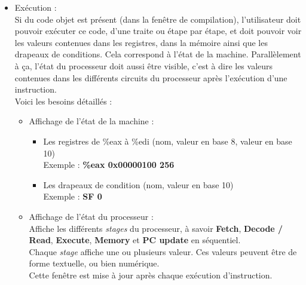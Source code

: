\documentclass[french]{article}
\begin{document}
\begin{itemize}
    \item Exécution :\\
    Si du code objet est présent (dans la fenêtre de compilation), l'utilisateur doit pouvoir exécuter ce code, d'une traite ou étape par étape, et doit pouvoir voir les valeurs contenues dans les registres, dans la mémoire ainsi que les drapeaux de conditions. Cela correspond à l'état de la machine. Parallèlement à ça, l'état du processeur doit aussi être visible, c'est à dire les valeurs contenues dans les différents circuits du processeur après l'exécution d'une instruction.\\ %
    Voici les besoins détaillés :
    \begin{itemize}
        \item Affichage de l'état de la machine :
        \begin{itemize}
            \item Les registres de \%eax à \%edi (nom, valeur en base 8, valeur en base 10)\\
            Exemple : \textbf{\%eax 0x00000100 256}
            \item Les drapeaux de condition (nom, valeur en base 10)\\
            Exemple : \textbf{SF 0}
        \end{itemize}{}
        \item Affichage de l'état du processeur :\\
        Affiche les différents \textit{stages} du processeur, à savoir \textbf{Fetch}, \textbf{Decode / Read}, \textbf{Execute}, \textbf{Memory} et \textbf{PC update} en séquentiel.\\
        Chaque \textit{stage} affiche une ou plusieurs valeur. Ces valeurs peuvent être de forme textuelle, ou bien numérique.\\
        Cette fenêtre est mise à jour après chaque exécution d'instruction.
    \end{itemize}{}
    
\end{itemize}{}
\end{document}
